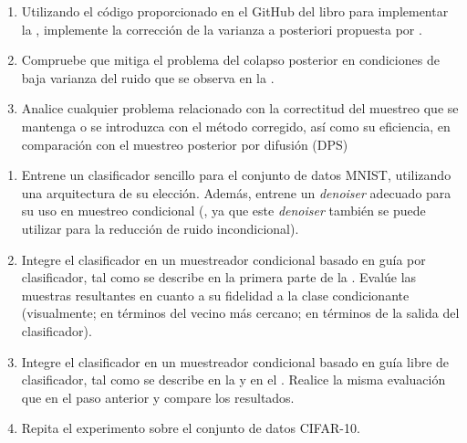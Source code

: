 \documentclass[../../book-main_es.tex]{subfiles}
\begin{document}
\begin{exercise}

    \begin{enumerate}
        \item Utilizando el código proporcionado en el GitHub del libro para implementar la
            ,
            implemente la
            corrección de la varianza a posteriori propuesta por
            \textcite{rozet2024learning}.
        \item Compruebe que mitiga el problema del colapso posterior en condiciones de baja varianza del ruido
            que se observa en la
            .
        \item Analice cualquier problema relacionado con la correctitud del muestreo que se mantenga o
            se introduzca con el método corregido, así como su
            eficiencia, en comparación con
            el muestreo posterior por difusión (DPS)
    \end{enumerate}

\end{exercise}

\begin{exercise}
    \begin{enumerate}
        \item Entrene un clasificador sencillo para el conjunto de datos MNIST, utilizando
            una arquitectura
            de su elección. Además, entrene un \textit{denoiser} adecuado para su uso en
            muestreo condicional
            (,
                ya que este \textit{denoiser} también se puede utilizar para la
            reducción de ruido incondicional).
        \item Integre el clasificador en un muestreador condicional basado en
            guía por clasificador, tal como se describe en la primera parte de la
            .
            Evalúe las muestras resultantes en cuanto a su fidelidad a la
            clase condicionante (visualmente; en términos del
                vecino más cercano; en términos de
            la salida del clasificador).
        \item Integre el clasificador en un muestreador condicional basado en
            guía libre de clasificador, tal como se describe en la  y
            en el . Realice la misma
            evaluación que en el paso anterior y compare los resultados.
        \item Repita el experimento sobre el conjunto de datos CIFAR-10.
    \end{enumerate}

\end{exercise}
\end{document}
